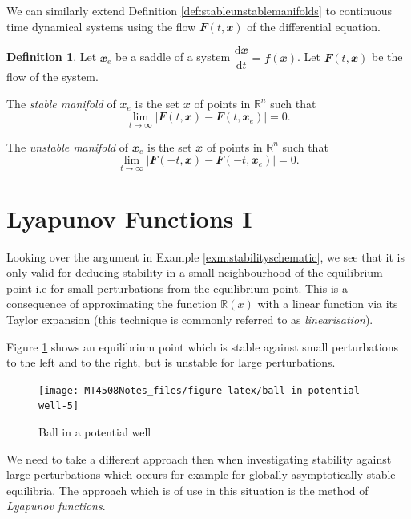 \documentclass[
  a4paper,
  oneside,
  final]{krantz}
\newcommand{\R}{\mathbb{R}}
\renewcommand{\d}{\mathrm{d}}
\renewcommand{\v}[1]{{\mathbfit{#1}}}
\newcommand{\der}[2]{\dfrac{\d #1}{\d #2}}
\theoremstyle{definition}
\newtheorem{definition}{Definition}[chapter]
\theoremstyle{definition}
\theoremstyle{definition}
\theoremstyle{definition}
\theoremstyle{remark}
\begin{document}
We can similarly extend Definition \ref{def:stableunstablemanifolds} to continuous time dynamical systems using the flow \(\v{F}(t,\v{x})\) of the differential equation.

\begin{definition}
\protect\hypertarget{def:stable-and-unstable-manifolds-cont}{}\label{def:stable-and-unstable-manifolds-cont}Let \(\v{x}_{e}\) be a saddle of a system \(\der{\v{x}}{t} = \v{f}(\v{x})\). Let \(\v{F}(t,\v{x})\) be the flow of the system.

The \emph{stable manifold} of \(\v{x}_{e}\) is the set \(\v{x}\) of points in \(\R^{n}\) such that
\[\lim_{t \to \infty} |\v{F}(t,\v{x}) - \v{F}(t, \v{x}_e)| = 0.\]

The \emph{unstable manifold} of \(\v{x}_{e}\) is the set \(\v{x}\) of points in \(\R^{n}\) such that
\[\lim_{t \to \infty} |\v{F}(-t,\v{x}) - \v{F}(-t, \v{x}_e)| = 0.\]
\end{definition}

\hypertarget{Lyapunov-functions-I}{%
\section{Lyapunov Functions I}\label{Lyapunov-functions-I}}

Looking over the argument in Example \ref{exm:stabilityschematic}, we see that it is only valid for deducing stability in a small neighbourhood of the equilibrium point i.e for small perturbations from the equilibrium point. This is a consequence of approximating the function \(\R(x)\) with a linear function via its Taylor expansion (this technique is commonly referred to as \emph{linearisation}).

Figure \ref{fig:ball-in-potential-well} shows an equilibrium point which is stable against small perturbations to the left and to the right, but is unstable for large perturbations.

\begin{figure}

{\centering \texttt{[image: MT4508Notes\_files/figure-latex/ball-in-potential-well-5]} 

}

\caption{Ball in a potential well}\label{fig:ball-in-potential-well}
\end{figure}

We need to take a different approach then when investigating stability against large perturbations which occurs for example for globally asymptotically stable equilibria. The approach which is of use in this situation is the method of \emph{Lyapunov functions}.
\end{document}
